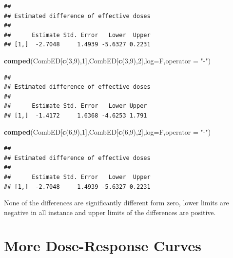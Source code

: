 \documentclass[letterpaper,]{book}
\newenvironment{Shaded}{\begin{snugshade}}{\end{snugshade}}
\newcommand{\DataTypeTok}[1]{\textcolor[rgb]{0.13,0.29,0.53}{#1}}
\newcommand{\DecValTok}[1]{\textcolor[rgb]{0.00,0.00,0.81}{#1}}
\newcommand{\KeywordTok}[1]{\textcolor[rgb]{0.13,0.29,0.53}{\textbf{#1}}}
\newcommand{\NormalTok}[1]{#1}
\newcommand{\StringTok}[1]{\textcolor[rgb]{0.31,0.60,0.02}{#1}}
\begin{document}
\begin{verbatim}
## 
## Estimated difference of effective doses
## 
##      Estimate Std. Error   Lower  Upper
## [1,]  -2.7048     1.4939 -5.6327 0.2231
\end{verbatim}

\begin{Shaded}
\begin{Highlighting}[]
\KeywordTok{comped}\NormalTok{(CombED[}\KeywordTok{c}\NormalTok{(}\DecValTok{3}\NormalTok{,}\DecValTok{9}\NormalTok{),}\DecValTok{1}\NormalTok{],CombED[}\KeywordTok{c}\NormalTok{(}\DecValTok{3}\NormalTok{,}\DecValTok{9}\NormalTok{),}\DecValTok{2}\NormalTok{],}\DataTypeTok{log=}\NormalTok{F,}\DataTypeTok{operator =} \StringTok{"-"}\NormalTok{)}
\end{Highlighting}
\end{Shaded}

\begin{verbatim}
## 
## Estimated difference of effective doses
## 
##      Estimate Std. Error   Lower Upper
## [1,]  -1.4172     1.6368 -4.6253 1.791
\end{verbatim}

\begin{Shaded}
\begin{Highlighting}[]
\KeywordTok{comped}\NormalTok{(CombED[}\KeywordTok{c}\NormalTok{(}\DecValTok{6}\NormalTok{,}\DecValTok{9}\NormalTok{),}\DecValTok{1}\NormalTok{],CombED[}\KeywordTok{c}\NormalTok{(}\DecValTok{6}\NormalTok{,}\DecValTok{9}\NormalTok{),}\DecValTok{2}\NormalTok{],}\DataTypeTok{log=}\NormalTok{F,}\DataTypeTok{operator =} \StringTok{"-"}\NormalTok{)}
\end{Highlighting}
\end{Shaded}

\begin{verbatim}
## 
## Estimated difference of effective doses
## 
##      Estimate Std. Error   Lower  Upper
## [1,]  -2.7048     1.4939 -5.6327 0.2231
\end{verbatim}

None of the differences are significantly different form zero, lower limits are negative in all instance and upper limits of the differences are positive.

\hypertarget{more-dose-response-curves}{%
\section{More Dose-Response Curves}\label{more-dose-response-curves}}
\end{document}
